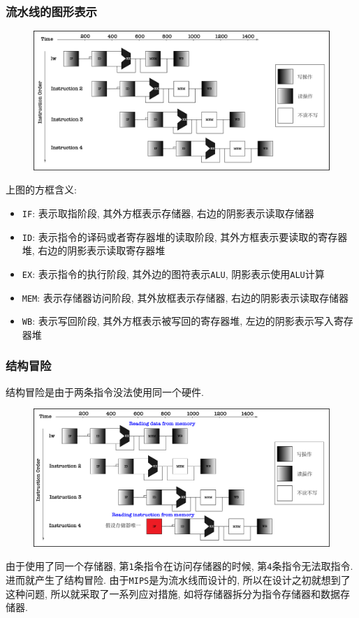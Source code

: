 \subsubsection{流水线的图形表示}
\begin{figure}[H]
\centering
\includegraphics[scale=.4]{img/figure45.pdf}
\end{figure}
上图的方框含义:
\begin{itemize}
\item \verb|IF|: 表示取指阶段, 其外方框表示存储器, 右边的阴影表示读取存储器
\item \verb|ID|: 表示指令的译码或者寄存器堆的读取阶段, 其外方框表示要读取的寄存器堆, 右边的阴影表示读取寄存器堆
\item \verb|EX|: 表示指令的执行阶段, 其外边的图符表示\verb|ALU|, 阴影表示使用\verb|ALU|计算
\item \verb|MEM|: 表示存储器访问阶段, 其外放框表示存储器, 右边的阴影表示读取存储器
\item \verb|WB|: 表示写回阶段, 其外方框表示被写回的寄存器堆, 左边的阴影表示写入寄存器堆
\end{itemize}\par
\subsubsection{结构冒险}
结构冒险是由于两条指令没法使用同一个硬件.
\begin{figure}[H]
\centering
\includegraphics[scale=.4]{img/figure40.pdf}
\end{figure}
由于使用了同一个存储器, 第\verb|1|条指令在访问存储器的时候, 第\verb|4|条指令无法取指令. 进而就产生了结构冒险. 由于\verb|MIPS|是为流水线而设计的, 所以在设计之初就想到了这种问题, 所以就采取了一系列应对措施, 如将存储器拆分为指令存储器和数据存储器.
